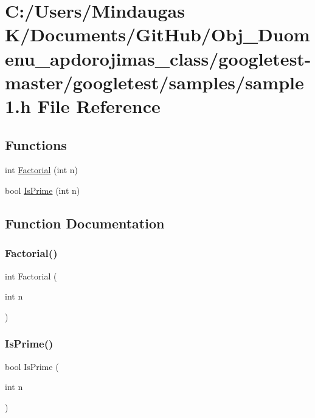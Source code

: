 \hypertarget{googletest-master_2googletest_2samples_2sample1_8h}{}\section{C\+:/\+Users/\+Mindaugas K/\+Documents/\+Git\+Hub/\+Obj\+\_\+\+Duomenu\+\_\+apdorojimas\+\_\+class/googletest-\/master/googletest/samples/sample1.h File Reference}
\label{googletest-master_2googletest_2samples_2sample1_8h}
\subsection*{Functions}
\begin{DoxyCompactItemize}
\item 
int \mbox{\hyperlink{googletest-master_2googletest_2samples_2sample1_8h_a0e7da4d7a69c5b5afb707807aa177017}{Factorial}} (int n)
\item 
bool \mbox{\hyperlink{googletest-master_2googletest_2samples_2sample1_8h_a7093217f5edc11fe277d03bd064e5f11}{Is\+Prime}} (int n)
\end{DoxyCompactItemize}


\subsection{Function Documentation}
\mbox{\label{googletest-master_2googletest_2samples_2sample1_8h_a0e7da4d7a69c5b5afb707807aa177017}} 
\subsubsection{\texorpdfstring{Factorial()}{Factorial()}}
{\footnotesize\ttfamily int Factorial (\begin{DoxyParamCaption}\item[{int}]{n }\end{DoxyParamCaption})}

\mbox{\label{googletest-master_2googletest_2samples_2sample1_8h_a7093217f5edc11fe277d03bd064e5f11}} 
\subsubsection{\texorpdfstring{IsPrime()}{IsPrime()}}
{\footnotesize\ttfamily bool Is\+Prime (\begin{DoxyParamCaption}\item[{int}]{n }\end{DoxyParamCaption})}

